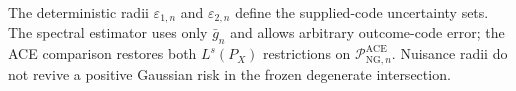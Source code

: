 The deterministic radii \(\varepsilon_{1,n}\) and \(\varepsilon_{2,n}\) define the supplied-code uncertainty sets.  The spectral estimator uses only \(\bar g_n\) and allows arbitrary outcome-code error; the ACE comparison restores both \(L^s(P_X)\) restrictions on \(\mathcal P_{\mathrm{NG},n}^{\mathrm{ACE}}\).  Nuisance radii do not revive a positive Gaussian risk in the frozen degenerate intersection.